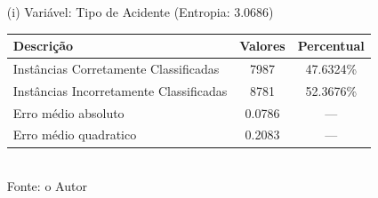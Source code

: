 \begin{enumerate}
	\item[(i)] Variável: Tipo de Acidente (Entropia: 3.0686)
		\begin{table}[!ht]
			\centering
			\vspace{1mm}
			\begin{tabular}{l|c|c}
				\hline
				\textbf{Descrição} & \textbf{Valores} & \textbf{Percentual} \\
				\hline
				Instâncias Corretamente Classificadas & 7987 & 47.6324\% \\
				Instâncias Incorretamente Classificadas & 8781 & 52.3676\% \\
				Erro médio absoluto & 0.0786 & ---  \\
				Erro médio quadratico & 0.2083 & --- \\
			\end{tabular}
			\\
			\tiny Fonte: o Autor
		\end{table}
		
		

\end{enumerate}
